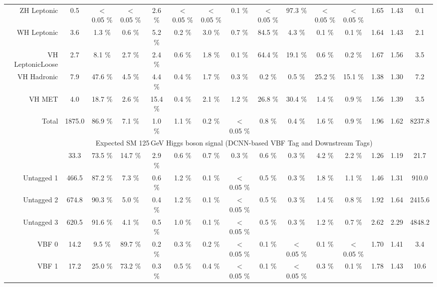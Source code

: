 \begin{landscape}
\begin{table}
{\begin{tabular}{rcccccccccccccc}
        ZH Leptonic &    0.5  &  $<$0.05 \% &  $<$0.05 \% &  2.6 \% &  $<$0.05 \% &  $<$0.05 \% &  0.1 \% &  $<$0.05 \% &  97.3 \% &  $<$0.05 \% &  $<$0.05 \%& 1.65 & 1.43 & 0.1 \\
        WH Leptonic &    3.6  &  1.3 \% &  0.6 \% &  5.2 \% &  0.2 \% &  3.0 \% &  0.7 \% &  84.5 \% &  4.3 \% &  0.1 \% &  0.1 \%& 1.64 & 1.43 & 2.1 \\
        VH LeptonicLoose &    2.7  &  8.1 \% &  2.7 \% &  2.4 \% &  0.6 \% &  1.8 \% &  0.1 \% &  64.4 \% &  19.1 \% &  0.6 \% &  0.2 \%& 1.67 & 1.56 & 3.5 \\
        \rowcolor{VHH} VH Hadronic &    7.9  &  47.6 \% &  4.5 \% &  4.4 \% &  0.4 \% &  1.7 \% &  0.3 \% &  0.2 \% &  0.5 \% &  25.2 \% &  15.1 \%& 1.38 & 1.30 & 7.2 \\
        \rowcolor{VHM} VH MET &    4.0  &  18.7 \% &  2.6 \% &  15.4 \% &  0.4 \% &  2.1 \% &  1.2 \% &  26.8 \% &  30.4 \% &  1.4 \% &  0.9 \%& 1.56 & 1.39 & 3.5 \\
        \rowcolor{Gray} Total &    1875.0  &  86.9 \% &  7.1 \% &  1.0 \% &  1.1 \% &  0.2 \% &  $<$0.05 \% &  0.8 \% &  0.4 \% &  1.6 \% &  0.9 \%& 1.96 & 1.62 & 8237.8 \\
        \hline
            \multirow{2}{*}{} &\multicolumn{13}{c}{Expected SM 125\,GeV Higgs boson signal (DCNN-based VBF Tag and Downstream Tags)} & \\ \cline{2-14}
        \hline
        \rowcolor{GGH0} Untagged 0 &    33.3  &  73.5 \% &  14.7 \% &  2.9 \% &  0.6 \% &  0.7 \% &  0.3 \% &  0.6 \% &  0.3 \% &  4.2 \% &  2.2 \%& 1.26 & 1.19 &  21.7 \\
        \rowcolor{GGH1} Untagged 1 &    466.5  &  87.2 \% &  7.3 \% &  0.6 \% &  1.2 \% &  0.1 \% &  $<$0.05 \% &  0.5 \% &  0.3 \% &  1.8 \% &  1.1 \%& 1.46 & 1.31 &  910.0 \\
        \rowcolor{GGH2} Untagged 2 &    674.8  &  90.3 \% &  5.0 \% &  0.4 \% &  1.2 \% &  0.1 \% &  $<$0.05 \% &  0.5 \% &  0.3 \% &  1.4 \% &  0.8 \%& 1.92 & 1.64 &  2415.6 \\
        \rowcolor{GGH3} Untagged 3 &    620.5  &  91.6 \% &  4.1 \% &  0.5 \% &  1.0 \% &  0.1 \% &  $<$0.05 \% &  0.5 \% &  0.3 \% &  1.2 \% &  0.7 \%& 2.62 & 2.29 &  4848.2 \\
        \rowcolor{VBF0} VBF 0 &    14.2  &  9.5 \% &  89.7 \% &  0.2 \% &  0.3 \% &  0.2 \% &  $<$0.05 \% &  0.1 \% &  $<$0.05 \% &  0.1 \% &  $<$0.05 \%& 1.70 & 1.41 &  3.4 \\
        \rowcolor{VBF1} VBF 1 &    17.2  &  25.0 \% &  73.2 \% &  0.3 \% &  0.5 \% &  0.4 \% &  $<$0.05 \% &  0.1 \% &  $<$0.05 \% &  0.3 \% &  0.1 \%& 1.78 & 1.43 & 10.6 \\

\end{tabular}}
\end{table}
\end{landscape}
